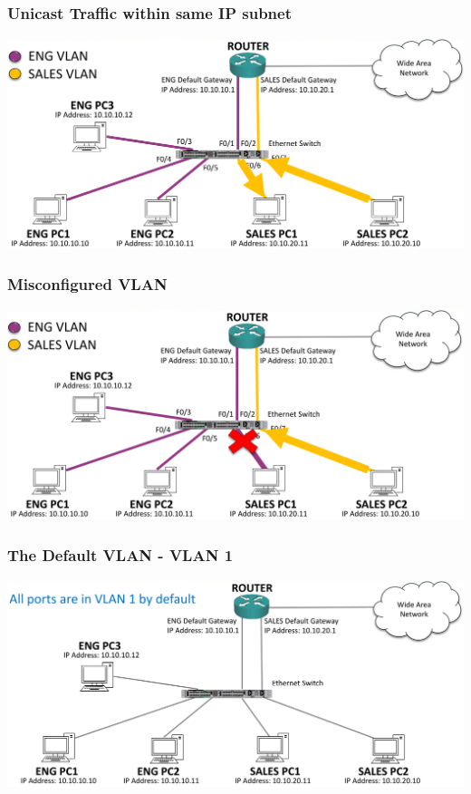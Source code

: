 \documentclass[pdflatex,compress,mathserif]{beamer}
\begin{document}
\begin{frame}
	\frametitle{Unicast Traffic within same IP subnet}
	\begin{center}
		\includegraphics[width=\linewidth]{img/img33}
	\end{center}
\end{frame}

\begin{frame}
	\frametitle{Misconfigured VLAN}
	\begin{center}
		\includegraphics[width=\linewidth]{img/img34}
	\end{center}
\end{frame}

\begin{frame}
	\frametitle{The Default VLAN - VLAN 1}
	\begin{center}
		\includegraphics[width=\linewidth]{img/img35}
	\end{center}
\end{frame}
\end{document}
